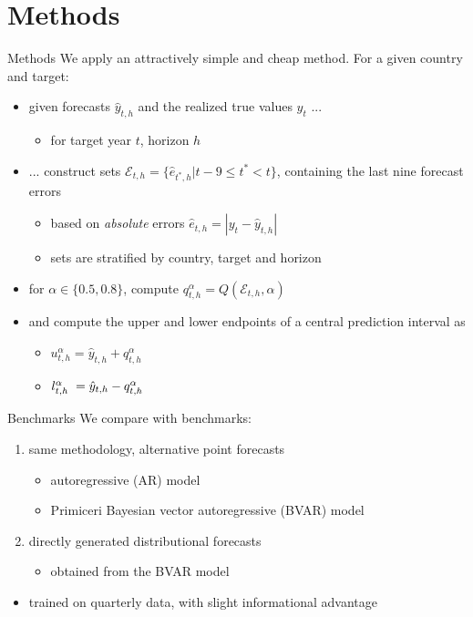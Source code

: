 \documentclass[en]{sdqbeamer}
\begin{document}
\section{Methods}
\begin{frame}{Methods}
We apply an attractively simple and cheap method. For a given country and target:
\begin{itemize}
    \item given forecasts $\hat{y}_{t, h}$ and the realized true values $y_{t}$ ...
    \begin{itemize}
        \item for target year $t$, horizon $h$
    \end{itemize}
    \item ... construct sets $\mathcal{E}_{t, h} = \{\hat{e}_{t^*, h}  | t-9 \leq t^* < t \}$, containing the last nine forecast errors
    \begin{itemize}
        \item based on \textit{absolute} errors $\hat{e}_{t,h} = |y_{t} - \hat{y}_{t, h}| $
        \item sets are stratified by country, target and horizon
    \end{itemize}
    \item for $\alpha \in \{0.5, 0.8\}$, compute $q^{\alpha}_{t, h} =  Q\left(\mathcal{E}_{t, h}, \alpha \right)$
    \item and compute the upper and lower endpoints of a central prediction interval as 
    \begin{itemize}
        \item $u^{\alpha}_{t,h} = \hat{y}_{t, h} + q^{\alpha}_{t, h}$ 
        \item $l^{\alpha}_{t,h} \hspace{1mm} = \hat{y}_{t, h} - q^{\alpha}_{t, h}$
    \end{itemize}
\end{itemize}
    
\end{frame}

\begin{frame}{Benchmarks}
    We compare with benchmarks:
\begin{enumerate}
    \item same methodology, alternative point forecasts
    \begin{itemize}
        \item autoregressive (AR) model
        \item Primiceri Bayesian vector autoregressive (BVAR) model
    \end{itemize}
    \item directly generated distributional forecasts
    \begin{itemize}
        \item obtained from the BVAR model
    \end{itemize}
\end{enumerate}
\begin{itemize}
    \item trained on quarterly data, with slight informational advantage
\end{itemize}

\end{frame}
\end{document}
